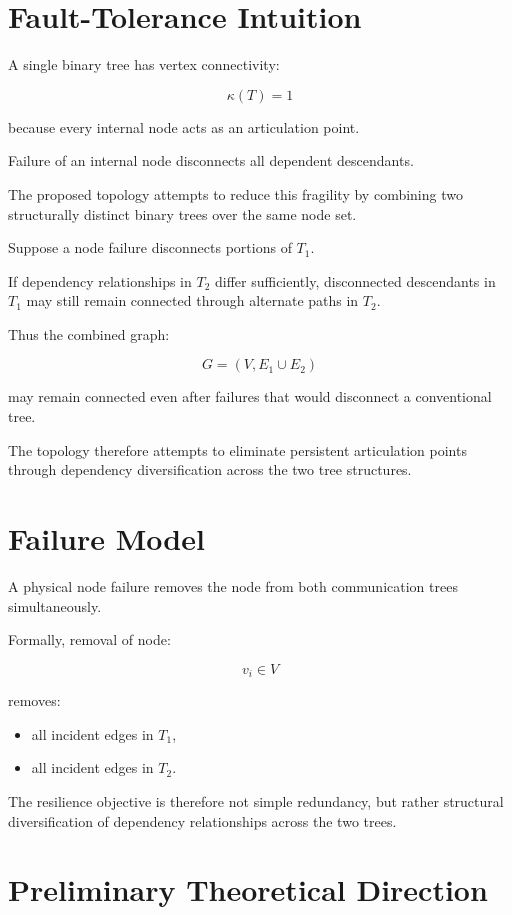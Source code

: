 \documentclass[11pt]{article}
\begin{document}
\section{Fault-Tolerance Intuition}

A single binary tree has vertex connectivity:

\[
\kappa(T)=1
\]

because every internal node acts as an articulation point.

Failure of an internal node disconnects all dependent descendants.

The proposed topology attempts to reduce this fragility by combining two structurally distinct binary trees over the same node set.

Suppose a node failure disconnects portions of \(T_1\).

If dependency relationships in \(T_2\) differ sufficiently, disconnected descendants in \(T_1\) may still remain connected through alternate paths in \(T_2\).

Thus the combined graph:

\[
G=(V,E_1\cup E_2)
\]

may remain connected even after failures that would disconnect a conventional tree.

The topology therefore attempts to eliminate persistent articulation points through dependency diversification across the two tree structures.

\section{Failure Model}

A physical node failure removes the node from both communication trees simultaneously.

Formally, removal of node:

\[
v_i \in V
\]

removes:
\begin{itemize}
    \item all incident edges in \(T_1\),
    \item all incident edges in \(T_2\).
\end{itemize}

The resilience objective is therefore not simple redundancy, but rather structural diversification of dependency relationships across the two trees.

\section{Preliminary Theoretical Direction}
\end{document}
